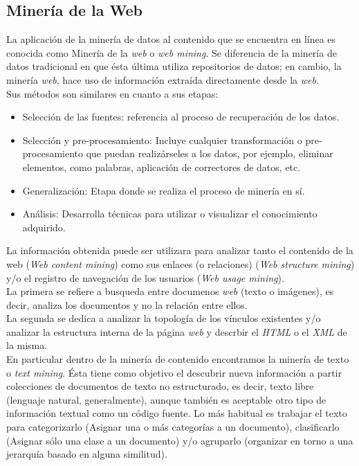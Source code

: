 	\subsection{Minería de la Web}
	\label{subsec:webMine}
	La aplicación de la minería de datos al contenido que se encuentra en línea es conocida como Minería de la \textit{web} o \textit{web mining}. Se diferencia de la minería de datos tradicional en que ésta última utiliza repositorios de datos; en cambio, la minería \textit{web}, hace uso de información extraída directamente desde la \textit{web}.\\
	Sus métodos son similares en cuanto a sus etapas:
	\begin{itemize}
	\item Selección de las fuentes: referencia al proceso de recuperación de los datos.
	\item Selección y pre-procesamiento: Incluye cualquier transformación o pre-procesamiento que puedan realizárseles a los datos, por ejemplo, eliminar elementos, como palabras, aplicación de correctores de datos, etc.
	\item Generalización: Etapa donde se realiza el proceso de minería en sí. 
	\item Análisis: Desarrolla técnicas para utilizar o visualizar el conocimiento adquirido.
	\end{itemize} 

	La información obtenida puede ser utilizara para analizar tanto el contenido de la web (\textit{Web content mining}) como sus enlaces (o relaciones) (\textit{Web  structure mining}) y/o el registro de navegación de los usuarios (\textit{Web usage mining}).\\

	La primera se refiere a busqueda entre documenos \textit{web} (texto o imágenes), es decir, analiza los documentos y no la relación entre ellos.\\

	La segunda se dedica a analizar la topología de los vínculos existentes y/o analizar la estructura interna de la página \textit{web} y descrbir el \textit{HTML} o el \textit{XML} de la misma.\\

	En particular dentro de la minería de contenido encontramos la minería de texto o \textit{text mining}. Ésta tiene como objetivo el descubrir nueva información a partir colecciones de documentos de texto no estructurado, es decir, texto libre (lenguaje natural, generalmente), aunque también es aceptable otro tipo de información textual como un código fuente. Lo más habitual es trabajar el texto para categorizarlo (Asignar una o más categorías a un documento), clasificarlo (Asignar sólo una clase a un documento) y/o agruparlo (organizar en torno a una jerarquía basado en alguna similitud).\\

